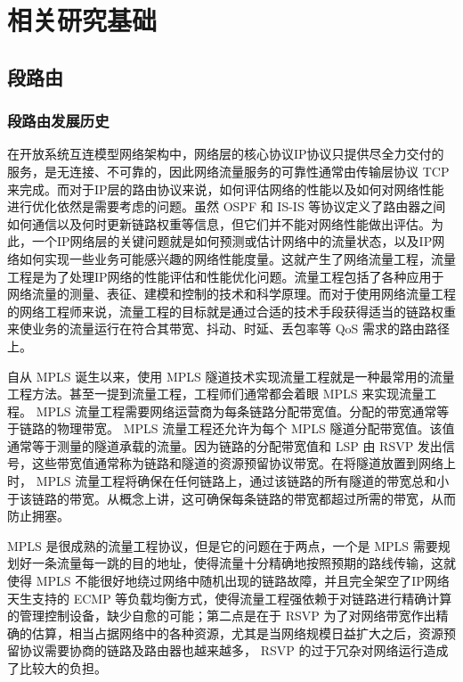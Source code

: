 \chapter{相关研究基础}


\section{段路由}

\subsection{段路由发展历史}

在开放系统互连模型网络架构中，网络层的核心协议IP协议只提供尽全力交付的服务，是无连接、不可靠的，因此网络流量服务的可靠性通常由传输层协议 \gls*{TCP} 来完成。而对于IP层的路由协议来说，如何评估网络的性能以及如何对网络性能进行优化依然是需要考虑的问题。虽然 \gls*{OSPF} 和 \gls*{IS-IS} 等协议定义了路由器之间如何通信以及何时更新链路权重等信息，但它们并不能对网络性能做出评估。为此，一个IP网络层的关键问题就是如何预测或估计网络中的流量状态，以及IP网络如何实现一些业务可能感兴趣的网络性能度量。这就产生了网络流量工程，流量工程是为了处理IP网络的性能评估和性能优化问题。流量工程包括了各种应用于网络流量的测量、表征、建模和控制的技术和科学原理。而对于使用网络流量工程的网络工程师来说，流量工程的目标就是通过合适的技术手段获得适当的链路权重来使业务的流量运行在符合其带宽、抖动、时延、丢包率等 \gls*{QoS} 需求的路由路径上。

自从 \gls*{MPLS} 诞生以来，使用 \gls*{MPLS} 隧道技术实现流量工程就是一种最常用的流量工程方法。甚至一提到流量工程，工程师们通常都会着眼 \gls*{MPLS} 来实现流量工程。 \gls*{MPLS} 流量工程需要网络运营商为每条链路分配带宽值。分配的带宽通常等于链路的物理带宽。 \gls*{MPLS} 流量工程还允许为每个 \gls*{MPLS} 隧道分配带宽值。该值通常等于测量的隧道承载的流量。因为链路的分配带宽值和 \gls*{LSP} 由 \gls*{RSVP} 发出信号，这些带宽值通常称为链路和隧道的资源预留协议带宽。在将隧道放置到网络上时， \gls*{MPLS} 流量工程将确保在任何链路上，通过该链路的所有隧道的带宽总和小于该链路的带宽。从概念上讲，这可确保每条链路的带宽都超过所需的带宽，从而防止拥塞。

\gls*{MPLS} 是很成熟的流量工程协议，但是它的问题在于两点，一个是 \gls*{MPLS} 需要规划好一条流量每一跳的目的地址，使得流量十分精确地按照预期的路线传输，这就使得 \gls*{MPLS} 不能很好地绕过网络中随机出现的链路故障，并且完全架空了IP网络天生支持的 \gls*{ECMP} 等负载均衡方式，使得流量工程强依赖于对链路进行精确计算的管理控制设备，缺少自愈的可能；第二点是在于 \gls*{RSVP} 为了对网络带宽作出精确的估算，相当占据网络中的各种资源，尤其是当网络规模日益扩大之后，资源预留协议需要协商的链路及路由器也越来越多， \gls*{RSVP} 的过于冗杂对网络运行造成了比较大的负担。

